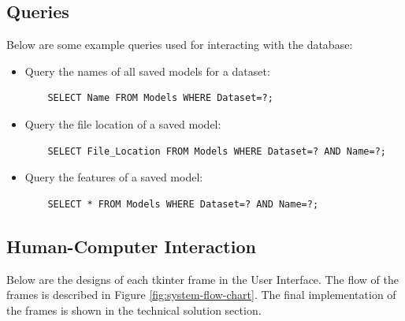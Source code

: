 \documentclass[./project-report/src/latex/project-report.tex]{subfiles}
\begin{document}
\subsection{Queries}

Below are some example queries used for interacting with the database:

\begin{itemize}
    \item Query the names of all saved models for a dataset:
    \begin{verbatim}
    SELECT Name FROM Models WHERE Dataset=?;
    \end{verbatim}
    \item Query the file location of a saved model:
    \begin{verbatim}
    SELECT File_Location FROM Models WHERE Dataset=? AND Name=?;
    \end{verbatim}
    \item Query the features of a saved model:
    \begin{verbatim}
    SELECT * FROM Models WHERE Dataset=? AND Name=?;
    \end{verbatim}
\end{itemize}

\subsection{Human-Computer Interaction}

Below are the designs of each tkinter frame in the User Interface. The flow of the frames is described in Figure \ref{fig:system-flow-chart}. The final implementation of the 
frames is shown in the technical solution section.
\end{document}
